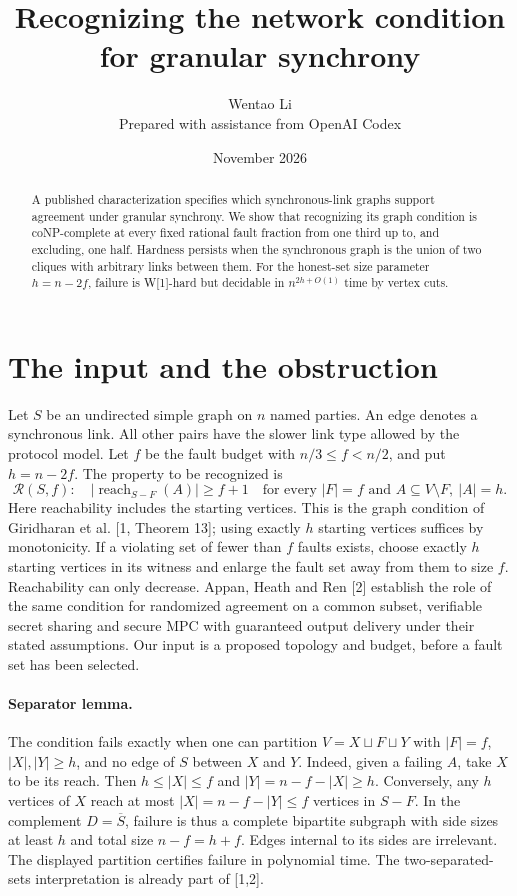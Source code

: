 \documentclass[11pt]{article}
\title{Recognizing the network condition for granular synchrony}
\author{Wentao Li\\[2pt]\small Prepared with assistance from OpenAI Codex}
\date{November 2026}
\begin{document}
\maketitle
\begin{abstract}
A published characterization specifies which synchronous-link graphs support agreement under granular synchrony. We show that recognizing its graph condition is coNP-complete at every fixed rational fault fraction from one third up to, and excluding, one half. Hardness persists when the synchronous graph is the union of two cliques with arbitrary links between them. For the honest-set size parameter $h=n-2f$, failure is W[1]-hard but decidable in $n^{2h+O(1)}$ time by vertex cuts.
\end{abstract}

\section{The input and the obstruction}
Let $S$ be an undirected simple graph on $n$ named parties. An edge denotes a synchronous link. All other pairs have the slower link type allowed by the protocol model. Let $f$ be the fault budget with $n/3\le f<n/2$, and put $h=n-2f$. The property to be recognized is
\[
 \mathcal R(S,f):\quad
 |\operatorname{reach}_{S-F}(A)|\ge f+1\quad
 \text{for every }|F|=f\text{ and }A\subseteq V\setminus F,\ |A|=h .
\]
Here reachability includes the starting vertices. This is the graph condition of Giridharan et al. [1, Theorem 13]; using exactly $h$ starting vertices suffices by monotonicity. If a violating set of fewer than $f$ faults exists, choose exactly $h$ starting vertices in its witness and enlarge the fault set away from them to size $f$. Reachability can only decrease. Appan, Heath and Ren [2] establish the role of the same condition for randomized agreement on a common subset, verifiable secret sharing and secure MPC with guaranteed output delivery under their stated assumptions. Our input is a proposed topology and budget, before a fault set has been selected.

\paragraph{Separator lemma.}
The condition fails exactly when one can partition $V=X\sqcup F\sqcup Y$ with $|F|=f$, $|X|,|Y|\ge h$, and no edge of $S$ between $X$ and $Y$. Indeed, given a failing $A$, take $X$ to be its reach. Then $h\le|X|\le f$ and $|Y|=n-f-|X|\ge h$. Conversely, any $h$ vertices of $X$ reach at most $|X|=n-f-|Y|\le f$ vertices in $S-F$. In the complement $D=\overline S$, failure is thus a complete bipartite subgraph with side sizes at least $h$ and total size $n-f=h+f$. Edges internal to its sides are irrelevant. The displayed partition certifies failure in polynomial time. The two-separated-sets interpretation is already part of [1,2].
\end{document}
